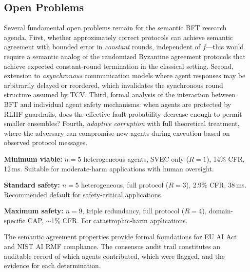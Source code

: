 \documentclass[journal,10pt]{IEEEtran}
\begin{document}
\subsection{Open Problems}
Several fundamental open problems remain for the semantic BFT research agenda. First, whether approximately correct protocols can achieve semantic agreement with bounded error in \emph{constant} rounds, independent of $f$---this would require a semantic analog of the randomized Byzantine agreement protocols that achieve expected constant-round termination in the classical setting. Second, extension to \emph{asynchronous} communication models where agent responses may be arbitrarily delayed or reordered, which invalidates the synchronous round structure assumed by TCV. Third, formal analysis of the interaction between BFT and individual agent safety mechanisms: when agents are protected by RLHF guardrails, does the effective fault probability decrease enough to permit smaller ensembles? Fourth, \emph{adaptive corruption} with full theoretical treatment, where the adversary can compromise new agents during execution based on observed protocol messages.



\textbf{Minimum viable:} $n=5$ heterogeneous agents, SVEC only ($R=1$), 14\% CFR, 12\,ms. Suitable for moderate-harm applications with human oversight.

\textbf{Standard safety:} $n=5$ heterogeneous, full protocol ($R=3$), 2.9\% CFR, 38\,ms. Recommended default for safety-critical applications.

\textbf{Maximum safety:} $n=9$, triple redundancy, full protocol ($R=4$), domain-specific CAP, $\sim$1\% CFR. For catastrophic-harm applications.


The semantic agreement properties provide formal foundations for EU AI Act and NIST AI RMF compliance. The consensus audit trail constitutes an auditable record of which agents contributed, which were flagged, and the evidence for each determination.
\end{document}
